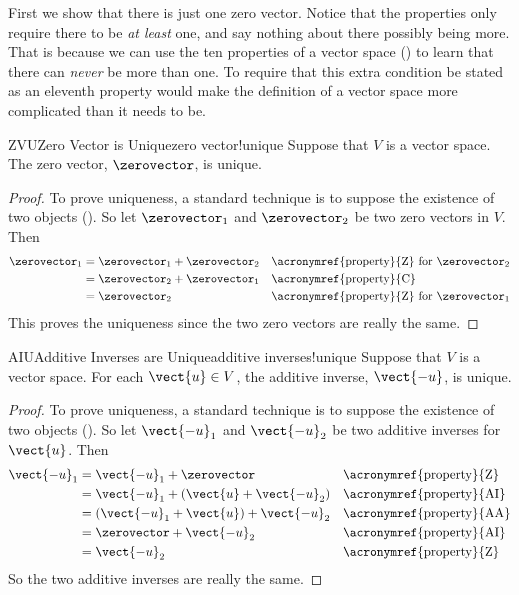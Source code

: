 %
First we show that there is just one zero vector.  Notice that the properties only require there to be {\em at least} one, and say nothing about there possibly being more.  That is because we can use the ten properties of a vector space () to learn that there can {\em never} be more than one.  To require that this extra condition be stated as an eleventh property would make the definition of a vector space more complicated than it needs to be.
%
\begin{theorem}{ZVU}{Zero Vector is Unique}{zero vector!unique}
%
Suppose that $V$ is a vector space.   The zero vector, $\zerovector$,  is unique.
%
\end{theorem}
%
\begin{proof}
To prove uniqueness, a standard technique is to suppose the existence of two objects ().  So let $\zerovector_1$ and $\zerovector_2$ be two zero vectors in $V$.  Then
%
\begin{align*}
\zerovector_1
&=\zerovector_1+\zerovector_2
&&\text{\acronymref{property}{Z} for $\zerovector_2$}\\
%
&=\zerovector_2+\zerovector_1
&&\text{\acronymref{property}{C}}\\
%
&=\zerovector_2
&&\text{\acronymref{property}{Z} for $\zerovector_1$}
%
\end{align*}
%
This proves the uniqueness since the two zero vectors are really the same.
\end{proof}
%
\begin{theorem}{AIU}{Additive Inverses are Unique}{additive inverses!unique}
%
Suppose that $V$ is a vector space.   For each $\vect{u}\in V$, the additive inverse, $\vect{-u}$, is unique.
%
\end{theorem}
%
\begin{proof}
To prove uniqueness, a standard technique is to suppose the existence of two objects ().  So let $\vect{-u}_1$ and $\vect{-u}_2$ be two additive inverses for $\vect{u}$.  Then
%
\begin{align*}
\vect{-u}_1&=\vect{-u}_1+\zerovector&&\text{\acronymref{property}{Z}}\\
&=\vect{-u}_1+(\vect{u}+\vect{-u}_2)&&\text{\acronymref{property}{AI}}\\
&=(\vect{-u}_1+\vect{u})+\vect{-u}_2&&\text{\acronymref{property}{AA}}\\
&=\zerovector+\vect{-u}_2&&\text{\acronymref{property}{AI}}\\
&=\vect{-u}_2&&\text{\acronymref{property}{Z}}
\end{align*}
%
So the two additive inverses are really the same.
\end{proof}
